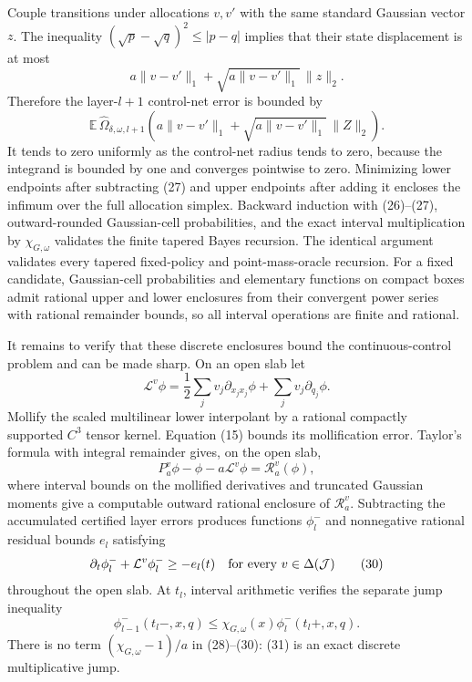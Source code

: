 Couple transitions under allocations \(v,v'\) with the same standard Gaussian vector \(z\).  The inequality \((\sqrt p-\sqrt q)^2\leq|p-q|\) implies that their state displacement is at most
\[
 a\|v-v'\|_1+\sqrt{a\|v-v'\|_1}\,\|z\|_2.
\]
Therefore the layer-\(l+1\) control-net error is bounded by
\[
 \mathbb E\,\widehat\Omega_{\delta,\omega,l+1}\!\left(
 a\|v-v'\|_1+\sqrt{a\|v-v'\|_1}\,\|Z\|_2\right).
 \tag{27}
\]
It tends to zero uniformly as the control-net radius tends to zero, because the integrand is bounded by one and converges pointwise to zero.  Minimizing lower endpoints after subtracting (27) and upper endpoints after adding it encloses the infimum over the full allocation simplex.  Backward induction with (26)--(27), outward-rounded Gaussian-cell probabilities, and the exact interval multiplication by \(\chi_{G,\omega}\) validates the finite tapered Bayes recursion.  The identical argument validates every tapered fixed-policy and point-mass-oracle recursion.  For a fixed candidate, Gaussian-cell probabilities and elementary functions on compact boxes admit rational upper and lower enclosures from their convergent power series with rational remainder bounds, so all interval operations are finite and rational.

It remains to verify that these discrete enclosures bound the continuous-control problem and can be made sharp.  On an open slab let
\[
 \mathcal L^v\phi=\frac12\sum_jv_j\partial_{x_jx_j}\phi+
 \sum_jv_j\partial_{q_j}\phi.
 \tag{28}
\]
Mollify the scaled multilinear lower interpolant by a rational compactly supported \(C^3\) tensor kernel.  Equation (15) bounds its mollification error.  Taylor's formula with integral remainder gives, on the open slab,
\[
 P_a^v\phi-\phi-a\mathcal L^v\phi=\mathcal R_a^v(\phi),
 \tag{29}
\]
where interval bounds on the mollified derivatives and truncated Gaussian moments give a computable outward rational enclosure of \(\mathcal R_a^v\).  Subtracting the accumulated certified layer errors produces functions \(\phi_l^-\) and nonnegative rational residual bounds \(e_l\) satisfying
\[
 \partial_t\phi_l^-+\mathcal L^v\phi_l^-\geq-e_l(t)
 \quad\hbox{for every }v\in\Delta(\mathcal J)
 \tag{30}
\]
throughout the open slab.  At \(t_l\), interval arithmetic verifies the separate jump inequality
\[
 \phi_{l-1}^-(t_l-,x,q)
 \leq\chi_{G,\omega}(x)\phi_l^-(t_l+,x,q).
 \tag{31}
\]
There is no term \((\chi_{G,\omega}-1)/a\) in (28)--(30): (31) is an exact discrete multiplicative jump.

